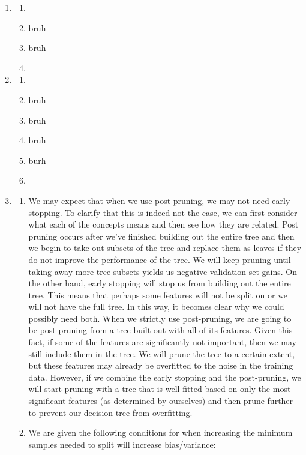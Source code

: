 \documentclass[12pt]{article}
\begin{document}
\begin{enumerate}
\item 
\begin{enumerate}
\item
\item bruh 
\item bruh 
\item 
\end{enumerate}

\item
\begin{enumerate}
\item 
\item bruh 
\item bruh 
\item bruh 
\item burh 
\item 
\end{enumerate}

\item
  \begin{enumerate}
  \item We may expect that when we use post-pruning, we may not need early stopping. To clarify that this is indeed not the case, we can first consider what each of the concepts means and then see how they are related. Post pruning 
  occurs after we've finished building out the entire tree and then we begin to take out subsets of the tree and replace them as leaves if they do not improve the performance of the tree. We will keep pruning until taking away more tree subsets yields us negative validation set gains. On the other hand, early stopping will stop us from 
  building out the entire tree. This means that perhaps some features will not be split on or we will not have the full tree. In this way, it becomes clear why we could possibly need both. When we strictly use post-pruning, we are going to be post-pruning from a tree built out with all of its features. Given this fact, if some of the features are significantly not important, then we may still include them in the tree. We will prune the tree to a certain extent, but these features may already be overfitted to the noise in the training data. However, if we combine the early stopping and the post-pruning, we will start pruning with a tree that is well-fitted based on only the most significant features (as determined by ourselves) and then prune further to prevent our decision tree from overfitting.
  \item We are given the following conditions for when increasing the minimum samples needed to split will increase bias/variance: 
  

\end{enumerate}
\end{enumerate}
\end{document}
